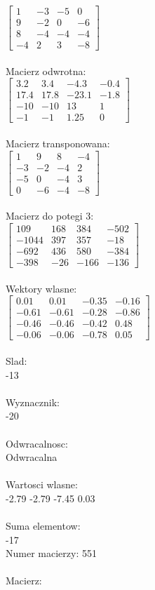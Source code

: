 \documentclass[a4paper,12pt]{article}
\begin{document}
$\begin{bmatrix} 1&-3&-5&0\\9&-2&0&-6\\8&-4&-4&-4\\-4&2&3&-8 \end{bmatrix}$
\\
\\
Macierz odwrotna:\\

$\begin{bmatrix} 3.2&3.4&-4.3&-0.4\\17.4&17.8&-23.1&-1.8\\-10&-10&13&1\\-1&-1&1.25&0 \end{bmatrix}$
\\
\\
Macierz transponowana:\\

$\begin{bmatrix} 1&9&8&-4\\-3&-2&-4&2\\-5&0&-4&3\\0&-6&-4&-8 \end{bmatrix}$
\\
\\
Macierz do potegi 3:\\

$\begin{bmatrix} 109&168&384&-502\\-1044&397&357&-18\\-692&436&580&-384\\-398&-26&-166&-136 \end{bmatrix}$
\\
\\
Wektory wlasne:\\

$\begin{bmatrix} 0.01&0.01&-0.35&-0.16\\-0.61&-0.61&-0.28&-0.86\\-0.46&-0.46&-0.42&0.48\\-0.06&-0.06&-0.78&0.05 \end{bmatrix}$
\\
\\
Slad:\\
-13
\\
\\
Wyznacznik:\\
-20
\\
\\
Odwracalnosc:\\
Odwracalna
\\
\\
Wartosci wlasne:\\
-2.79 -2.79 -7.45 0.03
\\
\\
Suma elementow:\\
-17
\\
\newpage
Numer macierzy:
551
\\
\\
Macierz:\\
\end{document}
